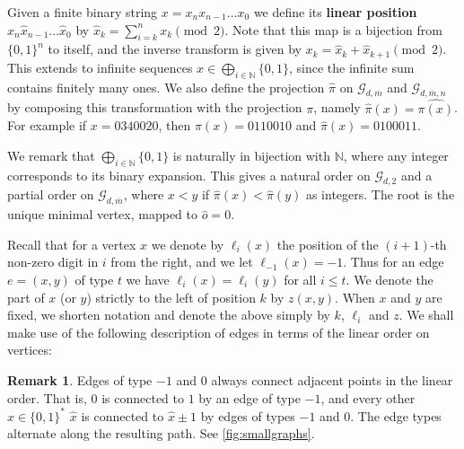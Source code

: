 \documentclass[12pt]{article}
\newtheorem{lemma}[thm]{Lemma}
\newtheorem{defn}[thm]{Definition}
\theoremstyle{definition}
\newtheorem{remark}[thm]{Remark}
\numberwithin{equation}{section}
\newcommand{\note}[1]{{\bf \textcolor{red}{[#1]}}}
\newcommand{\N}{\mathbb N}
\newcommand{\cG}{\mathcal{G}}
\renewcommand{\hat}{\widehat}
\newcommand{\mbar}{{\overline m}}
\begin{document}

Given a finite binary string $x=x_nx_{n-1}\dots x_0$ we define its \textbf{linear position} $\hat{x}_n \hat{x}_{n-1}\dots \hat{x}_0$ by $\hat{x}_k = \sum_{i=k}^{n} x_k \pmod{2}$.
Note that this map is a bijection from $\{0,1\}^n$ to itself, and the inverse transform is given by $x_k=\hat{x}_k + \hat{x}_{k+1} \pmod{2}$.
This extends to infinite sequences $x\in \bigoplus_{i\in\N} \{0,1\}$, since
the infinite sum contains finitely many ones.
We also define the projection $\hat\pi$ on $\cG_{d,\mbar}$ and $\cG_{d,\mbar,n}$ by composing this transformation with the projection $\pi$, namely $\hat\pi(x) = \widehat{\pi(x)}$.
For example if $x=0340020$, then $\pi(x)=0110010$ and $\hat\pi(x) = 0100011$.

We remark that $\bigoplus_{i\in \N} \{0,1\}$ is naturally in bijection with $\N$, where any integer corresponds to its binary expansion.
This gives a natural order on $\cG_{d,2}$ and a partial order on $\cG_{d,\mbar}$, where $x<y$ if $\hat\pi(x)<\hat\pi(y)$ as integers.
The root is the unique minimal vertex, mapped to $\hat{o} = 0$.

Recall that for a vertex $x$ we denote by $\ell_i(x)$ the position of the $(i+1)$-th non-zero digit in $i$ from the right, and we let $\ell_{-1}(x)=-1$.
Thus for an edge $e=(x,y)$ of type $t$ we have $\ell_i(x)=\ell_i(y)$ for all $i\leq t$.
We denote the part of $x$ (or $y$) strictly to the left of position $k$ by $z(x,y)$.
When $x$ and $y$ are fixed, we shorten notation and denote the above simply by $k$, $\ell_i$ and $z$.
We shall make use of the following description of edges in terms of the linear order on vertices:



\begin{remark}\label{C:0-1edges}
  Edges of type $-1$ and $0$ always connect adjacent points in the linear order.
  That is, $0$ is connected to $1$ by an edge of type $-1$, and every other $x\in \{0,1\}^*$ $\hat{x}$ is connected to $\hat{x}\pm 1$ by edges of types $-1$ and $0$.
  The edge types alternate along the resulting path.
  See \cref{fig:smallgraphs}.
\end{remark}
\end{document}
